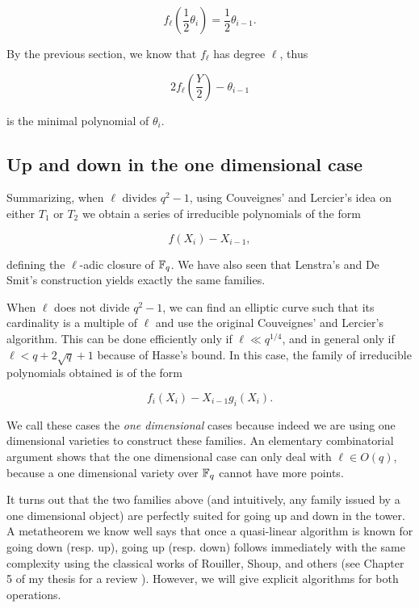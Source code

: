 \documentclass[11pt]{article}
\begin{document}
\begin{equation}
  f_\ell\left(\frac{1}{2}\theta_i\right) = \frac{1}{2}\theta_{i-1}.
\end{equation}

By the previous section, we know that $f_\ell$ has degree $\ell$, thus

\begin{equation}
  2f_\ell\left(\frac{Y}{2}\right) - \theta_{i-1}
\end{equation}

is the minimal polynomial of $\theta_i$.

\subsection{Up and down in the one dimensional case}

Summarizing, when $\ell$ divides $q^2-1$, using Couveignes' and
Lercier's idea on either $T_1$ or $T_2$ we obtain a series of
irreducible polynomials of the form

\begin{equation}
  f(X_i) - X_{i-1},
\end{equation}

defining the $\ell$-adic closure of $\mathbb{F}_q$. We have also seen that
Lenstra's and De Smit's construction yields exactly the same families.

When $\ell$ does not divide $q^2-1$, we can find an elliptic curve
such that its cardinality is a multiple of $\ell$ and use the original
Couveignes' and Lercier's algorithm. This can be done efficiently only
if $\ell\ll q^{1/4}$, and in general only if $\ell<q+2\sqrt{q}+1$
because of Hasse's bound. In this case, the family of irreducible
polynomials obtained is of the form

\begin{equation}
  f_i(X_i) - X_{i-1}g_i(X_i).
\end{equation}

We call these cases the \emph{one dimensional} cases because indeed we
are using one dimensional varieties to construct these families. An
elementary combinatorial argument shows that the one dimensional case
can only deal with $\ell\in O(q)$, because a one dimensional variety
over $\mathbb{F}_q$ cannot have more points.

It turns out that the two families above (and intuitively, any family
issued by a one dimensional object) are perfectly suited for going up
and down in the tower. A metatheorem we know well says that once a
quasi-linear algorithm is known for going down (resp. up), going up
(resp. down) follows immediately with the same complexity using the
classical works of Rouiller, Shoup, and others (see Chapter 5 of my
thesis for a review \cite{df+thesis}). However, we will give explicit
algorithms for both operations.
\end{document}
